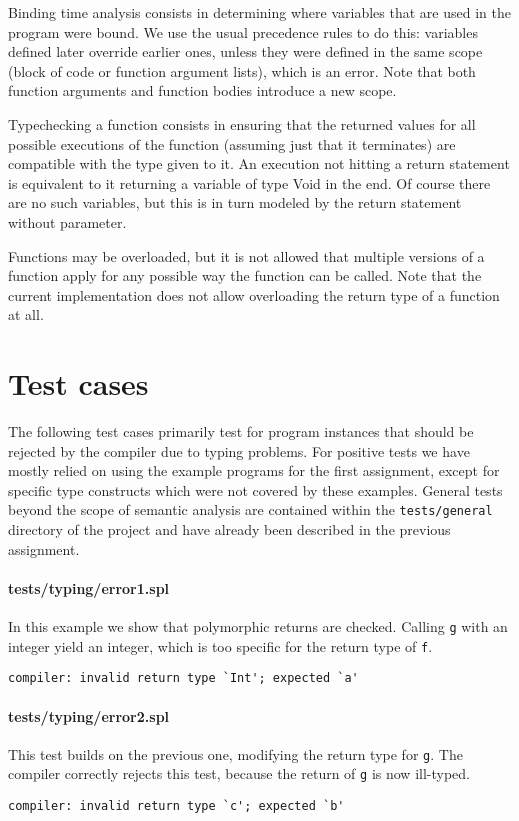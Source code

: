 \documentclass[a4paper]{article}
\begin{document}
Binding time analysis consists in determining where variables that are used in the program were bound.
We use the usual precedence rules to do this: variables defined later override earlier ones, unless they were defined in the same scope (block of code or function argument lists), which is an error.
Note that both function arguments and function bodies introduce a new scope.

Typechecking a function consists in ensuring that the returned values for all possible executions of the function (assuming just that it terminates) are compatible with the type given to it.
An execution not hitting a return statement is equivalent to it returning a variable of type Void in the end.
Of course there are no such variables, but this is in turn modeled by the return statement without parameter.

Functions may be overloaded, but it is not allowed that multiple versions of a function apply for any possible way the function can be called.
Note that the current implementation does not allow overloading the return type of a function at all.

\section*{Test cases}
The following test cases primarily test for program instances that should be rejected by the compiler due to typing problems. For positive tests we have mostly relied on using the example programs for the first assignment, except for specific type constructs which were not covered by these examples. General tests beyond the scope of semantic analysis are contained within the \verb|tests/general| directory of the project and have already been described in the previous assignment.

\paragraph{tests/typing/error1.spl} In this example we show that polymorphic returns are checked. Calling \verb|g| with an integer yield an integer, which is too specific for the return type of \verb|f|.
    \begin{verbatim}
compiler: invalid return type `Int'; expected `a'
    \end{verbatim}

\paragraph{tests/typing/error2.spl} This test builds on the previous one, modifying the return type for \verb|g|. The compiler correctly rejects this test, because the return of \verb|g| is now ill-typed.
    \begin{verbatim}
compiler: invalid return type `c'; expected `b'
    \end{verbatim}
\end{document}

